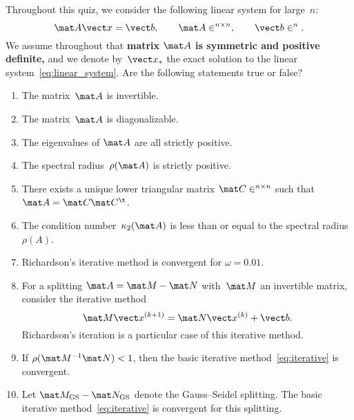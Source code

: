 \documentclass{article}
\begin{document}
Throughout this quiz,
we consider the following linear system for large~$n$:
\begin{equation}
    \label{eq:linear_system}
    \mat A \vect x = \vect b,
    \qquad \mat A \in \real^{n \times n},
    \qquad \vect b \in \real^n.
\end{equation}
We assume throughout that \textbf{matrix $\mat A$ is symmetric and positive definite,}
and we denote by~$\vect x_*$ the exact solution to the linear system~\eqref{eq:linear_system}.
Are the following statements true or false?
\begin{enumerate}

    \item
        The matrix~$\mat A$ is invertible.

    \item
        The matrix~$\mat A$ is diagonalizable.

    \item
        The eigenvalues of $\mat A$ are all strictly positive.

    \item
        The spectral radius~$\rho(\mat A)$ is strictly positive.

    \item
        There exists a unique lower triangular matrix $\mat C \in \real^{n \times n}$ such that $\mat A = \mat C \mat C^\t$.

    \item
        The condition number~$\kappa_2(\mat A)$ is less than or equal to the spectral radius~$\rho(A)$.

    \item
        Richardson's iterative method is convergent for $\omega = 0.01$.

    \item
        For a splitting $\mat A = \mat M - \mat N$
        with~$\mat M$ an invertible matrix,
        consider the iterative method
        \begin{equation}
            \label{eq:iterative}
            \mat M \vect x^{(k+1)} = \mat N \vect x^{(k)} + \vect b.
        \end{equation}
        Richardson's iteration is a particular case of this iterative method.

    \item
        If $\rho(\mat M^{-1} \mat N) < 1$, 
        then the basic iterative method~\eqref{eq:iterative} is convergent.

    \item
        Let $\mat M_{\rm GS} - \mat N_{\rm GS}$ denote the Gauss--Seidel splitting.
        The basic iterative method~\eqref{eq:iterative} is convergent for this splitting.


\end{enumerate}
\end{document}
